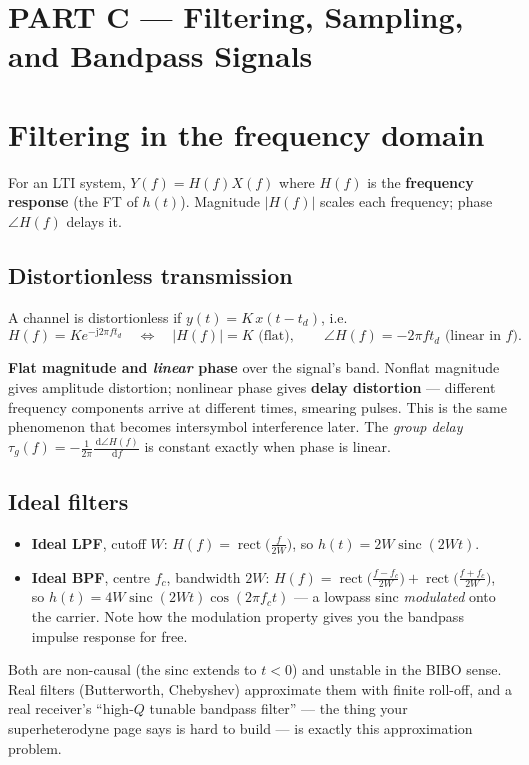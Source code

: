 \documentclass[11pt,a4paper]{article}
\newcommand{\sinc}{\operatorname{sinc}}
\newcommand{\rect}{\operatorname{rect}}
\newcommand{\dd}{\,\mathrm{d}}
\newcommand{\ii}{\mathrm{j}}
\begin{document}
\section*{\color{keyblue}PART C --- Filtering, Sampling, and Bandpass Signals}

\section{Filtering in the frequency domain}

For an LTI system, $Y(f)=H(f)X(f)$ where $H(f)$ is the \textbf{frequency response} (the FT of $h(t)$).
Magnitude $|H(f)|$ scales each frequency; phase $\angle H(f)$ delays it.

\subsection{Distortionless transmission}
A channel is distortionless if $y(t)=K\,x(t-t_d)$, i.e.
\[
H(f)=K e^{-\ii2\pi f t_d}
\quad\Longleftrightarrow\quad
|H(f)|=K \text{ (flat)}, \qquad \angle H(f)=-2\pi f t_d \text{ (linear in $f$)}.
\]
\begin{keybox}
\textbf{Flat magnitude and \emph{linear} phase} over the signal's band. Nonflat magnitude gives amplitude
distortion; nonlinear phase gives \textbf{delay distortion} --- different frequency components arrive at
different times, smearing pulses. This is the same phenomenon that becomes intersymbol interference later.
The \emph{group delay} $\tau_g(f)=-\frac{1}{2\pi}\frac{\dd\angle H(f)}{\dd f}$ is constant exactly when phase
is linear.
\end{keybox}

\subsection{Ideal filters}
\begin{itemize}[leftmargin=*]
\item \textbf{Ideal LPF}, cutoff $W$: $H(f)=\rect\!\big(\tfrac{f}{2W}\big)$, so $h(t)=2W\sinc(2Wt)$.
\item \textbf{Ideal BPF}, centre $f_c$, bandwidth $2W$: $H(f)=\rect\!\big(\tfrac{f-f_c}{2W}\big)+\rect\!\big(\tfrac{f+f_c}{2W}\big)$,
so $h(t)=4W\sinc(2Wt)\cos(2\pi f_ct)$ --- a lowpass sinc \emph{modulated} onto the carrier. Note how the
modulation property gives you the bandpass impulse response for free.
\end{itemize}
Both are non-causal (the sinc extends to $t<0$) and unstable in the BIBO sense. Real filters (Butterworth,
Chebyshev) approximate them with finite roll-off, and a real receiver's ``high-$Q$ tunable bandpass filter''
--- the thing your superheterodyne page says is hard to build --- is exactly this approximation problem.
\end{document}
